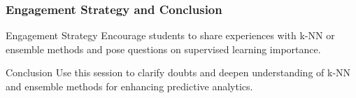 \documentclass[aspectratio=169]{beamer}
\begin{document}
\begin{frame}[fragile]
    \frametitle{Engagement Strategy and Conclusion}
    \begin{block}{Engagement Strategy}
        Encourage students to share experiences with k-NN or ensemble methods and pose questions on supervised learning importance.
    \end{block}

    \begin{block}{Conclusion}
        Use this session to clarify doubts and deepen understanding of k-NN and ensemble methods for enhancing predictive analytics.
    \end{block}
\end{frame}
\end{document}
